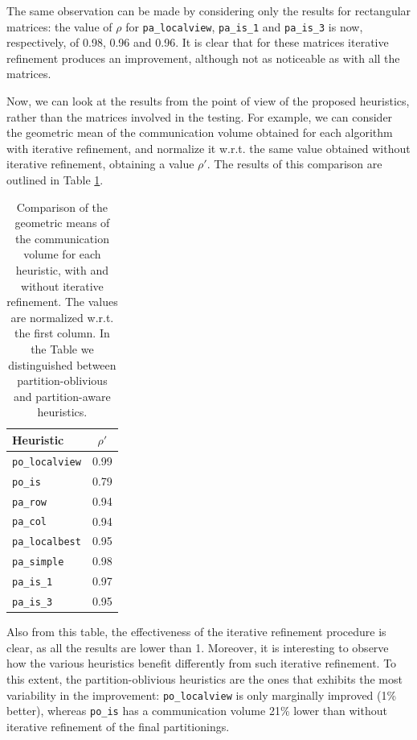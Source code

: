 The same observation can be made by considering only the results for rectangular matrices: the value of $\rho$ for \verb|pa_localview|, \verb|pa_is_1| and \verb|pa_is_3| is now, respectively, of 0.98, 0.96 and 0.96. It is clear that for these matrices iterative refinement produces an improvement, although not as noticeable as with all the matrices.

Now, we can look at the results from the point of view of the proposed heuristics, rather than the matrices involved in the testing. For example, we can consider the geometric mean of the communication volume obtained for each algorithm with iterative refinement, and normalize it w.r.t. the same value obtained without iterative refinement, obtaining a value $\rho'$. The results of this comparison are outlined in Table \ref{tab:comparison_ir}.

\begin{table}[H]
	\centering
	\begin{tabular}{|l|c|}\hline
		Heuristic & $\rho'$ \\ \hline
		\verb|po_localview|  & 0.99 \\
		\verb|po_is| & 0.79 \\ \hline
		\verb|pa_row| & 0.94 \\
		\verb|pa_col| & 0.94 \\
		\verb|pa_localbest| & 0.95 \\
		\verb|pa_simple| & 0.98 \\
		\verb|pa_is_1| & 0.97 \\
		\verb|pa_is_3| & 0.95 \\ \hline
	\end{tabular}
	\caption{Comparison of the geometric means of the communication volume for each heuristic, with and without iterative refinement. The values are normalized w.r.t. the first column. In the Table we distinguished between partition-oblivious and partition-aware heuristics.} \label{tab:comparison_ir}
\end{table}

Also from this table, the effectiveness of the iterative refinement procedure is clear, as all the results are lower than 1. Moreover, it is interesting to observe how the various heuristics benefit differently from such iterative refinement. To this extent, the partition-oblivious heuristics are the ones that exhibits the most variability in the improvement: \verb|po_localview| is only marginally improved (1\% better), whereas \verb|po_is| has a communication volume 21\% lower than without iterative refinement of the final partitionings.
